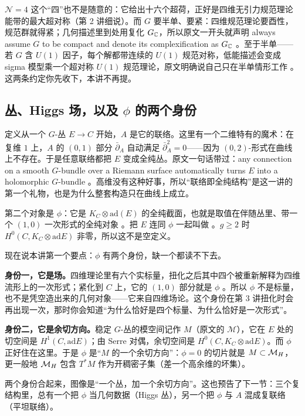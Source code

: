 $\mathcal N=4$ 这个“四”也不是随意的：它给出十六个超荷，正好是四维无引力规范理论能带的最大超对称（第 2 讲细说）。而 $G$ 要半单、要紧：四维规范理论要酉性，规范群就得紧；几何描述里到处用复化 $G_{\mathbb{C}}$，所以原文一开头就声明 always assume $G$ to be compact and denote its complexification as $G_{\mathbb{C}}$ 。至于半单——若 $G$ 含 $U(1)$ 因子，每个解都带连续的 $U(1)$ 规范对称，低能描述会变成 sigma 模型乘一个超对称 $U(1)$ 规范理论，原文明确说自己只在半单情形工作 。这两条约定你先收下，本讲不再提。

\subsection{丛、Higgs 场，以及 $\phi$ 的两个身份}

定义从一个 $G$-丛 $E\to C$ 开始，$A$ 是它的联络。这里有一个二维特有的魔术：在复维 $1$ 上，$A$ 的 $(0,1)$ 部分 $\bar\partial_A$ 自动满足 $\bar\partial_A^2=0$——因为 $(0,2)$-形式在曲线上不存在。于是任意联络都把 $E$ 变成全纯丛。原文一句话带过：any connection on a smooth $G$-bundle over a Riemann surface automatically turns $E$ into a holomorphic $G$-bundle 。高维没有这种好事，所以“联络即全纯结构”是这一讲的第一个礼物，也是为什么整套构造只在曲线上成立。

第二个对象是  $\phi$：它是 $K_C\otimes\mathrm{ad}(E)$ 的全纯截面，也就是取值在伴随丛里、带一个 $(1,0)$ 一次形式的全纯对象 。把 $E$ 连同 $\phi$ 一起叫做 。$g\ge2$ 时 $H^0(C,K_C\otimes\mathrm{ad}E)$ 非零，所以这不是空定义。

现在说本讲第一个要点：$\phi$ 有两个身份，缺一个都读不下去。

\textbf{身份一，它是场。}四维理论里有六个实标量，扭化之后其中四个被重新解释为四维流形上的一次形式；紧化到 $C$ 上，它的 $(1,0)$ 部分就是 $\phi$ 。所以 $\phi$ 不是标量，也不是凭空造出来的几何对象——它来自四维场论。这个身份在第 3 讲扭化时会再出现一次，那时你会知道“为什么恰好是四个标量、为什么恰好是一次形式”。

\textbf{身份二，它是余切方向。}稳定 $G$-丛的模空间记作 $M$（原文的 $\mathcal M$），它在 $E$ 处的切空间是 $H^1(C,\mathrm{ad}E)$；由 Serre 对偶，余切空间是 $H^0(C,K_C\otimes\mathrm{ad}E)$。而 $\phi$ 正好住在这里。于是 $\phi$ 是“$M$ 的一个余切方向”：$\phi=0$ 的切片就是 $M\subset\mathcal{M}_{H}$，更一般地 $\mathcal{M}_{H}$ 包含 $T^*M$ 作为开稠密子集（差一个高余维的坏集）。

两个身份合起来，图像是“一个丛，加一个余切方向”。这也预告了下一节：三个复结构里，总有一个把 $\phi$ 当几何数据（Higgs 丛），另一个把 $\phi$ 与 $A$ 混成复联络（平坦联络）。

